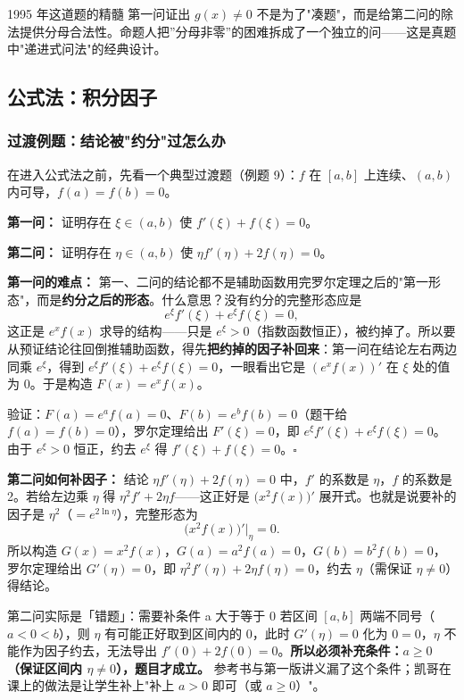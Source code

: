 \documentclass[a4paper]{article}
\begin{document}
\begin{knowledgebox}{1995 年这道题的精髓}
第一问证出 $g(x)\neq 0$ 不是为了"凑题"，而是给第二问的除法提供分母合法性。命题人把''分母非零''的困难拆成了一个独立的问——这是真题中"递进式问法"的经典设计。
\end{knowledgebox}

\subsection{公式法：积分因子}

\subsubsection{过渡例题：结论被"约分"过怎么办}

在进入公式法之前，先看一个典型过渡题（例题 9）：$f$ 在 $[a,b]$ 上连续、$(a,b)$ 内可导，$f(a)=f(b)=0$。

\textbf{第一问：} 证明存在 $\xi\in(a,b)$ 使 $f'(\xi)+f(\xi)=0$。

\textbf{第二问：} 证明存在 $\eta\in(a,b)$ 使 $\eta f'(\eta)+2f(\eta)=0$。

\textbf{第一问的难点：} 第一、二问的结论都不是辅助函数用完罗尔定理之后的"第一形态"，而是\textbf{约分之后的形态}。什么意思？没有约分的完整形态应是
\[
e^{\xi}f'(\xi)+e^{\xi}f(\xi)=0,
\]
这正是 $e^xf(x)$ 求导的结构——只是 $e^\xi>0$（指数函数恒正），被约掉了。所以要从预证结论往回倒推辅助函数，得先\textbf{把约掉的因子补回来}：第一问在结论左右两边同乘 $e^{\xi}$，得到 $e^\xi f'(\xi)+e^\xi f(\xi)=0$，一眼看出它是 $(e^xf(x))'$ 在 $\xi$ 处的值为 0。于是构造 $F(x)=e^xf(x)$。

验证：$F(a)=e^a f(a)=0$、$F(b)=e^b f(b)=0$（题干给 $f(a)=f(b)=0$），罗尔定理给出 $F'(\xi)=0$，即 $e^\xi f'(\xi)+e^\xi f(\xi)=0$。由于 $e^\xi>0$ 恒正，约去 $e^\xi$ 得 $f'(\xi)+f(\xi)=0$。$\square$

\textbf{第二问如何补因子：} 结论 $\eta f'(\eta)+2f(\eta)=0$ 中，$f'$ 的系数是 $\eta$，$f$ 的系数是 2。若给左边乘 $\eta$ 得 $\eta^2 f'+2\eta f$——这正好是 $\big(x^2f(x)\big)'$ 展开式。也就是说要补的因子是 $\eta^2$（$=e^{2\ln \eta}$），完整形态为
\[
\big(x^2 f(x)\big)'\big|_{\eta}=0 .
\]
所以构造 $G(x)=x^2f(x)$，$G(a)=a^2f(a)=0$，$G(b)=b^2f(b)=0$，罗尔定理给出 $G'(\eta)=0$，即 $\eta^2f'(\eta)+2\eta f(\eta)=0$，约去 $\eta$（需保证 $\eta\neq0$）得结论。

\begin{warningbox}{第二问实际是「错题」：需要补条件 a 大于等于 0}
若区间 $[a,b]$ 两端不同号（$a<0<b$），则 $\eta$ 有可能正好取到区间内的 $0$，此时 $G'(\eta)=0$ 化为 $0=0$，$\eta$ 不能作为因子约去，无法导出 $f'(0)+2f(0)=0$。\textbf{所以必须补充条件：$a\ge0$（保证区间内 $\eta\neq0$），题目才成立。} 参考书与第一版讲义漏了这个条件；凯哥在课上的做法是让学生补上"补上 $a>0$ 即可（或 $a\ge0$）"。
\end{warningbox}
\end{document}
